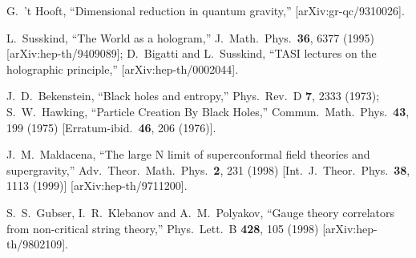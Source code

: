\documentclass[12pt]{article}
\renewcommand{\baselinestretch}{1.1}
\begin{document}
\noindent










\newcommand{\J}[4]{{\sl #1} {\bf #2} (#3) #4}
\newcommand{\andJ}[3]{{\bf #1} (#2) #3}
\newcommand{\AP}{Ann.\ Phys.\ (N.Y.)}
\newcommand{\MPL}{Mod.\ Phys.\ Lett.}
\newcommand{\NP}{Nucl.\ Phys.}
\newcommand{\PL}{Phys.\ Lett.}
\newcommand{\PR}{ Phys.\ Rev.}
\newcommand{\PRL}{Phys.\ Rev.\ Lett.}
\newcommand{\PTP}{Prog.\ Theor.\ Phys.}
\newcommand{\hep}[1]{{\tt hep-th/{#1}}}


\begin{thebibliography}{99}
\renewcommand{\baselinestretch}{0.89}\selectfont


\small












G.~'t Hooft,
  ``Dimensional reduction in quantum gravity,''
  [arXiv:gr-qc/9310026].

L.~Susskind,
  ``The World as a hologram,''
  J.\ Math.\ Phys.\  {\bf 36}, 6377 (1995)
  [arXiv:hep-th/9409089];
D.~Bigatti and L.~Susskind,
  ``TASI lectures on the holographic principle,''
  [arXiv:hep-th/0002044].


  J.~D.~Bekenstein,
  ``Black holes and entropy,''
  Phys.\ Rev.\  D {\bf 7}, 2333 (1973);
  S.~W.~Hawking,
  ``Particle Creation By Black Holes,''
  Commun.\ Math.\ Phys.\  {\bf 43}, 199 (1975)
  [Erratum-ibid.\  {\bf 46}, 206 (1976)].



J.~M.~Maldacena,
  ``The large N limit of superconformal field theories and supergravity,''
  Adv.\ Theor.\ Math.\ Phys.\  {\bf 2}, 231 (1998)
  [Int.\ J.\ Theor.\ Phys.\  {\bf 38}, 1113 (1999)]
  [arXiv:hep-th/9711200].


S.~S.~Gubser, I.~R.~Klebanov and A.~M.~Polyakov,
  ``Gauge theory correlators from non-critical string theory,''
  Phys.\ Lett.\ B {\bf 428}, 105 (1998)
  [arXiv:hep-th/9802109].


\end{thebibliography}
\end{document}
